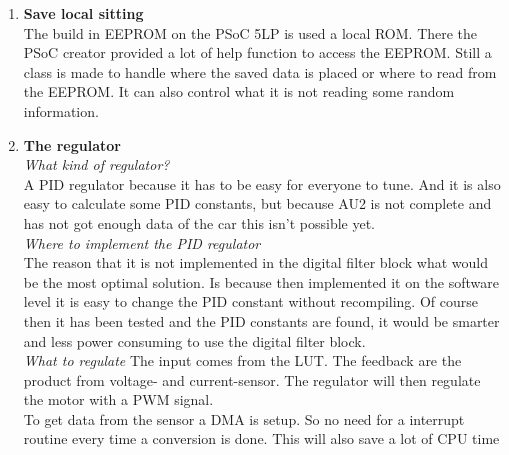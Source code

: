 \begin{enumerate}
	\item \textbf{Save local sitting}\\
	The build in EEPROM on the PSoC 5LP is used a local ROM. There the PSoC creator provided a lot of help function to access the EEPROM. Still a class is made to handle where the saved data is placed or where to read from the EEPROM. It can also control what it is not reading some random information.\\ 
	\item \textbf{The regulator}\\
	\subitem \textit{What kind of regulator?}\\
	A PID regulator because it has to be easy for everyone to tune. And it is also easy to calculate some PID constants, but because AU2 is not complete and has not got enough data of the car this isn't possible yet.\\
	\subitem \textit{Where to implement the PID regulator}\\
	The reason that it is not implemented in the digital filter block what would be the most optimal solution. Is because then implemented it on the software level it is easy to change the PID constant without recompiling. Of course then it has been tested and the PID constants are found, it would be smarter and less power consuming to use the digital filter block.\\
	\subitem \textit{What to regulate}
	The input comes from the LUT. The feedback are the product from voltage- and current-sensor. The regulator will then regulate the motor with a PWM signal.\\
	To get data from the sensor a DMA is setup. So no need for a interrupt routine every time a conversion is done. This will also save a lot of CPU time\\
\end{enumerate}

